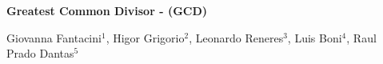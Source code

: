 \begin{center}




\textbf{Greatest Common Divisor - (GCD)}\vspace{0.5cm}

Giovanna Fantacini$^1$, 
Higor Grigorio$^2$, 
Leonardo Reneres$^3$, 
Luis Boni$^4$, 
Raul Prado Dantas$^5$











\end{center}

  
  
  
  


